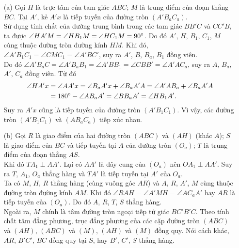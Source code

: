     \begin{solution}
        \hfill
        \begin{enumerate}
            \item[(a)] Gọi \(H\) là trực tâm của tam giác \(ABC\); \(M\) là trung điểm của đoạn thẳng \(BC\). Tại \(A'\), kẻ \(A'x\) là tiếp tuyến của đường tròn \((A'B_aC_a)\).\\
            Sử dụng tính chất của đường trung bình trong các tam giác \(BB'C\) và \(CC'B\), ta được \(\angle HA'M = \angle HB_1M = \angle HC_1M = 90 \degree\). Do đó \(A'\), \(H\), \(B_1\), \(C_1\), \(M\) cùng thuộc đường tròn đường kính \(HM\). Khi đó, \(\angle A'B_1C_1 = \angle CMC_1 = \angle A'BC'\), suy ra \(A'\), \(B\), \(B_a\), \(B_1\) đồng viên.\\
            Do đó \(\angle A'B_aC = \angle A'B_aB_1 = \angle A'BB_1 = \angle CBB' = \angle A'AC_a\), suy ra \(A\), \(B_a\), \(A'\), \(C_a\) đồng viên. Từ đó
            \begin{equation}
                \begin{aligned}
                    \angle HA'x &= \angle AA'x = \angle B_aA'x + \angle B_aA'A = \angle A'AB_a + \angle B_aA'A \\
                    &= 180 \degree - \angle AB_aA' = \angle BB_aA' = \angle HB_1A'.
                \end{aligned}
                \notag
            \end{equation}
            Suy ra \(A'x\) cũng là tiếp tuyến của đường tròn \((A'B_1C_1)\). Vì vậy, các đường tròn \((A'B_1C_1)\) và \((AB_aC_a)\) tiếp xúc nhau.
            \item[(b)] Gọi \(R\) là giao điểm của hai đường tròn \((ABC)\) và \((AH)\) (khác \(A\)); \(S\) là giao điểm của \(BC\) và tiếp tuyến tại \(A\) của đường tròn \((O_a)\); \(T\) là trung điểm của đoạn thẳng \(AS\).\\
            Khi đó \(TA_1 \perp AA'\). Lại có \(AA'\) là dây cung của \((O_a)\) nên \(OA_1 \perp AA'\). Suy ra \(T\), \(A_1\), \(O_a\) thẳng hàng và \(TA'\) là tiếp tuyến tại \(A'\) của \(O_a\).\\
            Ta có \(M\), \(H\), \(R\) thẳng hàng (cùng vuông góc \(AR\)) và \(A\), \(R\), \(A'\), \(M\) cùng thuộc đường tròn đường kính \(AM\). Khi đó \(\angle RAH = \angle A'MH = \angle AC_aA'\) hay \(AR\) là tiếp tuyến của \((O_a)\). Do đó \(A\), \(R\), \(T\), \(S\) thẳng hàng.\\
            Ngoài ra, \(M\) chính là tâm đường tròn ngoại tiếp tứ giác \(BC'B'C\). Theo tính chất tâm đẳng phương, trục đẳng phương của các cặp đường tròn \((ABC)\) và \((AH)\), \((ABC)\) và \((M)\), \((AH)\) và \((M)\) đồng quy. Nói cách khác, \(AR\), \(B'C'\), \(BC\) đồng quy tại \(S\), hay \(B'\), \(C'\), \(S\) thẳng hàng.\\

\end{enumerate}
\end{solution}
